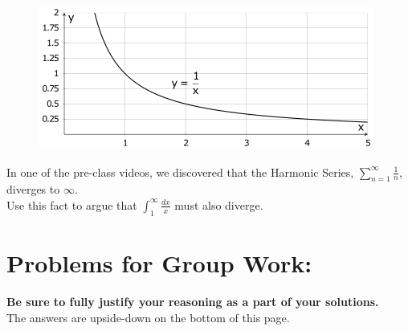\documentclass[10pt]{article}
\begin{document}
\begin{enumerate}
\begin{figure}[h]
%
%
%
\includegraphics[]{23SQ-Math-1336-Ch8s3-Part1-ws-figure1.png}
\end{figure}

In one of the pre-class videos, we discovered that the Harmonic Series, \(\sum_{n=1}^\infty \frac{1}{n}\), diverges to \(\infty\).\\
 Use this fact  to argue that \(\int_1^\infty \frac{dx}{x}\) must also diverge.\\



\end{enumerate}


\section*{Problems for Group Work:}
\textbf{Be sure to fully justify your reasoning as a part of your solutions.}\\
 The answers are upside-down on the bottom of this page.
\end{document}
